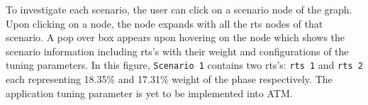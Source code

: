 To investigate each scenario, the user can click on a scenario node of the graph. Upon clicking on a node, the node expands with all the rts nodes of that scenario. A pop over box appears upon hovering on the node which shows the scenario information including rts's with their weight and configurations of the tuning parameters. In this figure, \texttt{Scenario~1} contains two rts's: \texttt{rts 1} and \texttt{rts 2} each representing 18.35\% and 17.31\% weight of the phase respectively. The application tuning parameter is yet to be implemented into ATM.